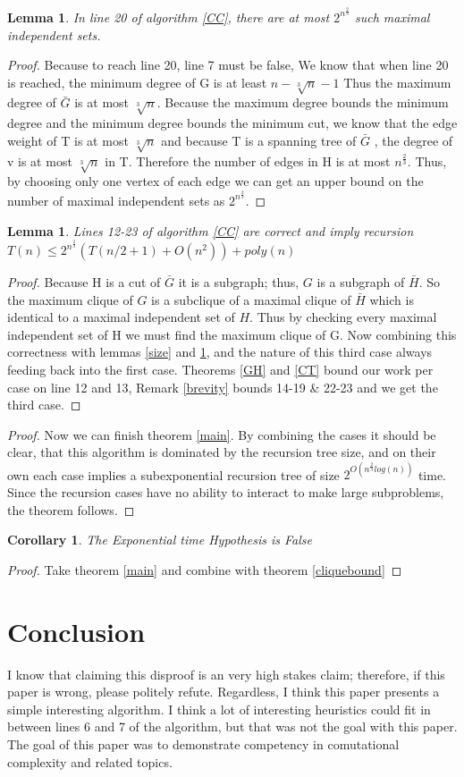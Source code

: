 \documentclass[12pt]{article}
\newtheorem{lem}[thm]{Lemma}
\newtheorem{cor}[thm]{Corollary}
\begin{document}
\begin{lem} \label{count} In line 20 of algorithm \ref{CC}, there are at most $2^{n^{\frac{2}{3}}}$ such maximal independent sets.\end{lem}
\begin{proof} Because to reach line 20, line 7 must be false, We know that when line 20 is reached, the minimum degree of G is at least $n - \sqrt[3]{n} -1$ Thus the maximum degree of $\bar{G}$ is at most $\sqrt[3]{n}$. Because the maximum degree bounds the minimum degree and the minimum degree bounds the minimum cut, we know that the edge weight of T is at most $\sqrt[3]{n}$ and because T is a spanning tree of $\bar{G}$ , the degree of v is at most $\sqrt[3]{n}$ in T. Therefore the number of edges in H is at most $n^{\frac{2}{3}}$. Thus, by choosing only one vertex of each edge we can get an upper bound on the number of maximal independent sets as $2^{n^{\frac{2}{3}}}$.
\end{proof}
\begin{lem}Lines 12-23 of algorithm \ref{CC} are correct and imply recursion $T(n) \le 2^{n^{\frac{2}{3}}}(T(n/2+1)+ O(n^2)) + poly(n)$\end{lem}
\begin{proof} Because H is a cut of $\bar{G}$ it is a subgraph; thus, $G$ is a subgraph of $\bar{H}$. So the maximum clique of $G$ is a subclique of a maximal clique of $\bar{H}$ which is identical to a maximal independent set of $H$. Thus by checking every maximal independent set of H we must find the maximum clique of G. Now combining this correctness with lemmas \ref{size} and \ref{count}, and the nature of this third case always feeding back into the first case. Theorems \ref{GH} and \ref{CT} bound our work per case on line 12 and 13, Remark \ref{brevity} bounds 14-19 \& 22-23 and we get the third case.
\end{proof}
\begin{proof}Now we can finish theorem \ref{main}. By combining the cases it should be clear, that this algorithm is dominated by the recursion tree size, and on their own each case implies a subexponential recursion tree of size $2^{O(n^{\frac{2}{3}}log(n))}$ time. Since the recursion cases have no ability to interact to make large subproblems, the theorem follows.\end{proof}
\begin{cor} The Exponential time Hypothesis is False\end{cor}
\begin{proof} Take theorem \ref{main} and combine with theorem \ref{cliquebound}\end{proof}
\section{Conclusion}
I know that claiming this disproof is an very high stakes claim; therefore, if this paper is wrong, please politely refute. Regardless, I think this paper presents a simple interesting algorithm. I think a lot of interesting heuristics could fit in between lines 6 and 7 of the algorithm, but that was not the goal with this paper. The goal of this paper was to demonstrate competency in comutational complexity and related topics.
\end{document}
